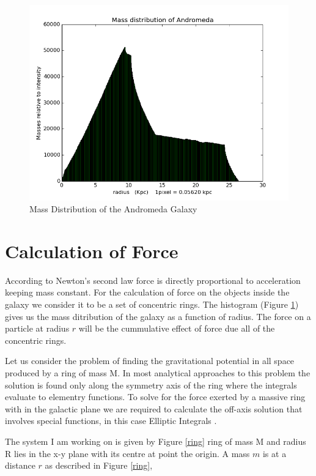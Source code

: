 \begin{enumerate}
\begin{figure} [h]
\label{histogram}
\centering
\includegraphics[scale=0.45]{400}
\caption{Mass Distribution of the Andromeda Galaxy }
\end{figure}

\end{enumerate}

\section{Calculation of Force}

According to Newton's second law force is directly proportional to acceleration keeping mass constant. For the calculation of force on the objects inside the galaxy we consider it to be a set of concentric rings. The histogram (Figure \ref{histogram}) gives us the mass ditribution of the galaxy as a function of radius. The force on a particle at radius $r$ will be the cummulative effect of force due all of the concentric rings.

Let us consider the problem of finding the gravitational potential in all space produced by a ring of mass M. In most analytical approaches to this problem the solution is found only along the symmetry axis of the ring where the integrals evaluate to elementry functions. To solve for the force exerted by a massive ring with in the galactic plane we are required to calculate the off-axis solution that involves special functions, in this case Elliptic Integrals \cite{paper}.
 
The system I am working on is given by Figure \ref{ring} ring of mass M and radius R lies in the x-y plane with its centre at point the origin. A mass $m$ is at a distance $r$ as described in Figure \ref{ring}, 

